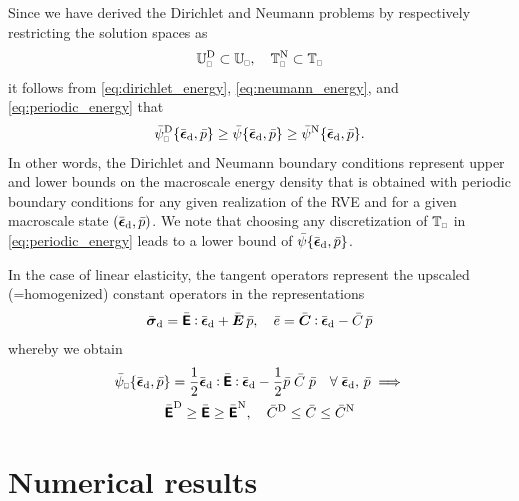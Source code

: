 \documentclass{bmcart}
\newcommand{\eqtref}[1]{\eqref{#1}}
\renewcommand{\dev}{\mathrm{d}}
\newcommand{\epspargs}{\{{\bar{\ts\epsilon}}_\dev, \bar{p}\}}
\newcommand{\rve}{
  {\mathchoice
   {\mbox{\scalebox{0.67}{$\Box$}}}
   {\mbox{\scalebox{0.67}{$\Box$}}}
   {\mbox{\scalebox{0.5}{$\Box$}}}
   {\mbox{\scalebox{0.375}{$\Box$}}}
  }
}
\begin{document}
Since we have derived the Dirichlet and Neumann problems by respectively restricting the solution spaces as
\begin{align}
 \set{U}_\rve^\Dirichlet \subset \set{U}_\rve,\quad \set{T}_\rve^\Neumann \subset \set{T}_\rve
\end{align}
it follows from \eqtref{eq:dirichlet_energy}, \eqtref{eq:neumann_energy}, and \eqtref{eq:periodic_energy} that
\begin{align}
 \bar\psi^\Dirichlet_\rve\{\bar{\ts\epsilon}_\dev, \bar{p}\} \geq \bar\psi\{\bar{\ts\epsilon}_\dev, \bar {p}\} \geq \bar\psi^\Neumann\{\bar{\ts\epsilon}_\dev, \bar {p}\}.
\end{align}
In other words, the Dirichlet and Neumann boundary conditions represent upper and lower bounds
on the macroscale energy density that is obtained with periodic boundary conditions for any given realization of the RVE and for a given macroscale state $(\bar{\ts\epsilon}_\dev, \bar{p})$.
We note that choosing any discretization of $\set{T}_\rve$ in \eqtref{eq:periodic_energy} leads to a lower bound of $\bar{\psi}\epspargs$.

In the case of linear elasticity, the tangent operators represent the upscaled (=homogenized) constant operators in the representations
\begin{align}
 \bar{\ts\sigma}_\dev = \bar{\tf E} \dprod \bar{\ts\epsilon}_\dev + \bar{\ts E}\, \bar{p}, \quad \bar{e} = \bar{\ts C}\dprod\bar{\ts\epsilon}_\dev - \bar{C}\,\bar{p}
\end{align}
whereby we obtain
\begin{multline}
 \bar{\psi}_\rve\{\bar{\ts\epsilon}_\dev, \bar{p}\} = \frac12 \bar{\ts\epsilon}_\dev \dprod \bar{\tf E}\dprod \bar{\ts\epsilon}_\dev -\frac12 \bar{p}\;\bar{C}\;\bar{p}
\quad\forall\;\bar{\ts\epsilon}_\dev,\,\bar{p}
\implies
\\
 \bar{\tf E}^\Dirichlet \geq \bar{\tf E} \geq \bar{\tf E}^\Neumann,\quad
 \bar{C}^\Dirichlet \leq \bar{C} \leq \bar{C}^\Neumann
\end{multline}



\section{Numerical results}
\end{document}
